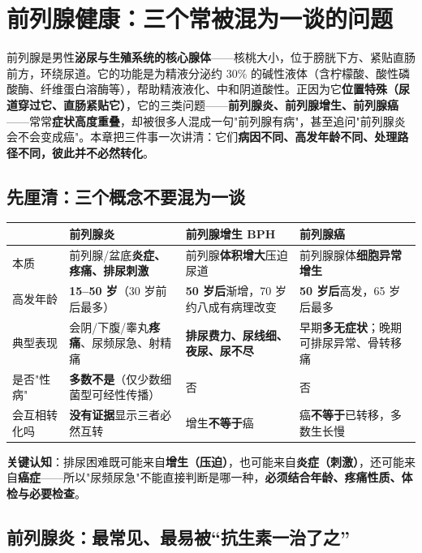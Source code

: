 \documentclass[12pt,UTF8,openany]{ctexbook}
\begin{document}
\chapter{前列腺健康：三个常被混为一谈的问题}
\label{chap:prostate}

前列腺是男性\textbf{泌尿与生殖系统的核心腺体}——核桃大小，位于膀胱下方、紧贴直肠前方，环绕尿道。它的功能是为精液分泌约 30\% 的碱性液体（含柠檬酸、酸性磷酸酶、纤维蛋白溶酶等），帮助精液液化、中和阴道酸性。正因为它\textbf{位置特殊（尿道穿过它、直肠紧贴它）}，它的三类问题——\textbf{前列腺炎、前列腺增生、前列腺癌}——常常\textbf{症状高度重叠}，却被很多人混成一句"前列腺有病"，甚至追问"前列腺炎会不会变成癌"。本章把三件事一次讲清：它们\textbf{病因不同、高发年龄不同、处理路径不同，彼此并不必然转化}。

\section{先厘清：三个概念不要混为一谈}

\begin{tabularx}{\textwidth}{l X X X}
\toprule
& \textbf{前列腺炎} & \textbf{前列腺增生 BPH} & \textbf{前列腺癌} \\
\midrule
本质 & 前列腺/盆底\textbf{炎症、疼痛、排尿刺激} & 前列腺\textbf{体积增大}压迫尿道 & 前列腺腺体\textbf{细胞异常增生} \\
高发年龄 & \textbf{15--50 岁}（30 岁前后最多） & \textbf{50 岁后}渐增，70 岁约八成有病理改变 & \textbf{50 岁后}高发，65 岁后最多 \\
典型表现 & 会阴/下腹/睾丸\textbf{疼痛}、尿频尿急、射精痛 & \textbf{排尿费力、尿线细、夜尿、尿不尽} & 早期\textbf{多无症状}；晚期可排尿异常、骨转移痛 \\
是否"性病" & \textbf{多数不是}（仅少数细菌型可经性传播） & 否 & 否 \\
会互相转化吗 & \textbf{没有证据}显示三者必然互转 & 增生\textbf{不等于}癌 & 癌\textbf{不等于}已转移，多数生长慢 \\
\bottomrule
\end{tabularx}

\vspace{0.5em}
\noindent\textbf{关键认知}：排尿困难既可能来自\textbf{增生（压迫）}，也可能来自\textbf{炎症（刺激）}，还可能来自\textbf{癌症}——所以"尿频尿急"不能直接判断是哪一种，\textbf{必须结合年龄、疼痛性质、体检与必要检查}。

\section{前列腺炎：最常见、最易被“抗生素一治了之”}
\end{document}
